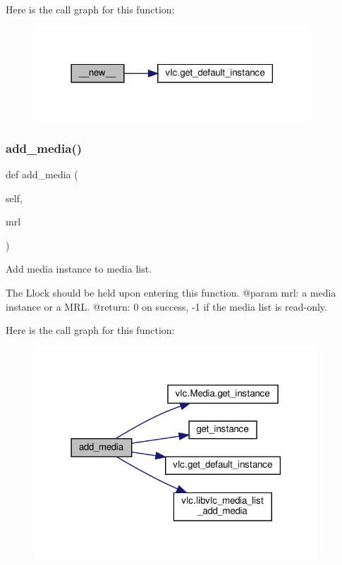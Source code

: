 Here is the call graph for this function\+:
\nopagebreak
\begin{figure}[H]
\begin{center}
\leavevmode
\includegraphics[width=294pt]{classvlc_1_1_media_list_acc2aa3fac6a63e8bac4f19efc327102b_cgraph}
\end{center}
\end{figure}
\mbox{\label{classvlc_1_1_media_list_a31bc69656e1be53564c74dc277f13ce1}} 
\subsubsection{\texorpdfstring{add\+\_\+media()}{add\_media()}}
{\footnotesize\ttfamily def add\+\_\+media (\begin{DoxyParamCaption}\item[{}]{self,  }\item[{}]{mrl }\end{DoxyParamCaption})}

\begin{DoxyVerb}Add media instance to media list.

The L{lock} should be held upon entering this function.
@param mrl: a media instance or a MRL.
@return: 0 on success, -1 if the media list is read-only.
\end{DoxyVerb}
 Here is the call graph for this function\+:
\nopagebreak
\begin{figure}[H]
\begin{center}
\leavevmode
\includegraphics[width=302pt]{classvlc_1_1_media_list_a31bc69656e1be53564c74dc277f13ce1_cgraph}
\end{center}
\end{figure}
\mbox{\label{classvlc_1_1_media_list_a5eb880efb244834d39c062297388252b}} 
